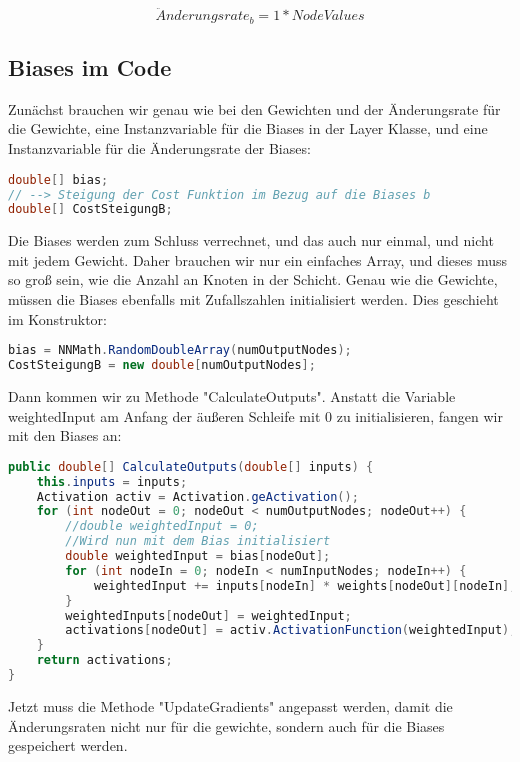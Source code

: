 \documentclass[12pt]{article}
\begin{document}
$$\ddot{A}nderungsrate_b = 1*NodeValues$$\subsection{ Biases im Code}Zunächst brauchen wir genau wie bei den Gewichten und der Änderungsrate für die Gewichte, eine Instanzvariable für die Biases in der Layer Klasse, und eine Instanzvariable für die Änderungsrate der Biases:\begin{lstlisting}[language=Java]
double[] bias;
// --> Steigung der Cost Funktion im Bezug auf die Biases b
double[] CostSteigungB;
\end{lstlisting}Die Biases werden zum Schluss verrechnet, und das auch nur einmal, und nicht mit jedem Gewicht. Daher brauchen wir nur ein einfaches Array, und dieses muss so groß sein, wie die Anzahl an Knoten in der Schicht. Genau wie die Gewichte, müssen die Biases ebenfalls mit Zufallszahlen initialisiert werden. Dies geschieht im Konstruktor:\begin{lstlisting}[language=Java]
bias = NNMath.RandomDoubleArray(numOutputNodes);
CostSteigungB = new double[numOutputNodes];
\end{lstlisting}Dann kommen wir zu Methode "CalculateOutputs". Anstatt die Variable weightedInput am Anfang der äußeren Schleife mit 0 zu initialisieren, fangen wir mit den Biases an:\begin{lstlisting}[language=Java]
public double[] CalculateOutputs(double[] inputs) {
    this.inputs = inputs;
    Activation activ = Activation.geActivation();
    for (int nodeOut = 0; nodeOut < numOutputNodes; nodeOut++) {
        //double weightedInput = 0;
        //Wird nun mit dem Bias initialisiert
        double weightedInput = bias[nodeOut];
        for (int nodeIn = 0; nodeIn < numInputNodes; nodeIn++) {
            weightedInput += inputs[nodeIn] * weights[nodeOut][nodeIn];
        }
        weightedInputs[nodeOut] = weightedInput;
        activations[nodeOut] = activ.ActivationFunction(weightedInput);
    }
    return activations;
}
\end{lstlisting}Jetzt muss die Methode "UpdateGradients" angepasst werden, damit die Änderungsraten nicht nur für die gewichte, sondern auch für die Biases gespeichert werden.
\end{document}
